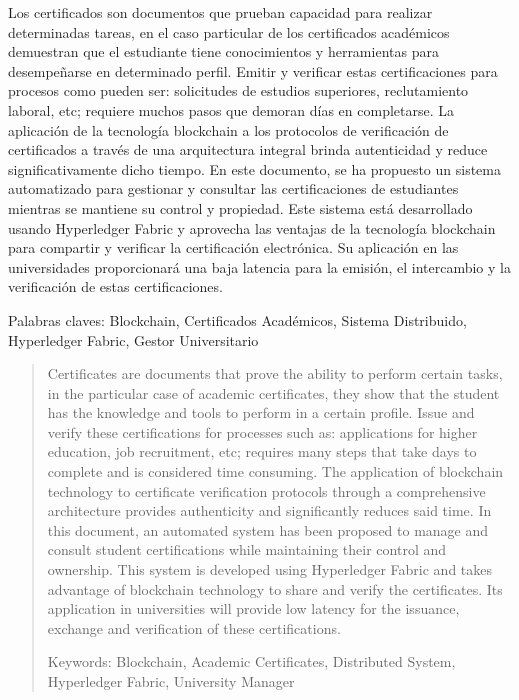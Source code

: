 \begin{resumen}
	Los certificados son documentos que prueban capacidad para realizar determinadas tareas, en el caso particular de los certificados académicos demuestran que el estudiante tiene conocimientos y herramientas para desempeñarse en determinado perfil. 
	Emitir y verificar estas certificaciones para procesos como pueden ser: solicitudes de estudios superiores,  reclutamiento laboral, etc; requiere muchos pasos que demoran días en completarse.
	La aplicación de la tecnología blockchain a los protocolos de verificación de certificados a través de una arquitectura integral brinda autenticidad y reduce significativamente dicho tiempo.
	En este documento, se ha propuesto un sistema automatizado para gestionar y consultar las certificaciones de estudiantes mientras se mantiene su control y propiedad.
	Este sistema está desarrollado usando Hyperledger Fabric y aprovecha las ventajas de la tecnología blockchain para compartir y verificar la certificación electrónica.
	Su aplicación en las universidades proporcionará una baja latencia para la emisión, el intercambio y la verificación de estas certificaciones.
	
	Palabras claves: Blockchain, Certificados Académicos, Sistema Distribuido, Hyperledger Fabric, Gestor Universitario
\end{resumen}

\begin{abstract}
	Certificates are documents that prove the ability to perform certain tasks, in the particular case of academic certificates, they show that the student has the knowledge and tools to perform in a certain profile.
	Issue and verify these certifications for processes such as: applications for higher education, job recruitment, etc; requires many steps that take days to complete and is considered time consuming.
	The application of blockchain technology to certificate verification protocols through a comprehensive architecture provides authenticity and significantly reduces said time.
	In this document, an automated system has been proposed to manage and consult student certifications while maintaining their control and ownership.
	This system is developed using Hyperledger Fabric and takes advantage of blockchain technology to share and verify the certificates.
	Its application in universities will provide low latency for the issuance, exchange and verification of these certifications.
	
	Keywords: Blockchain, Academic Certificates, Distributed System, Hyperledger Fabric, University Manager
\end{abstract}